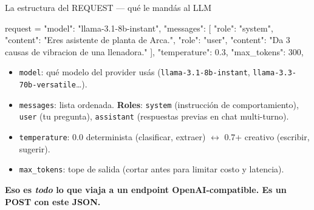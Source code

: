 \documentclass[aspectratio=169, 11pt]{beamer}
\begin{document}
\begin{frame}{La estructura del REQUEST --- qué le mandás al LLM}
  \vspace{2pt}
  \begin{pyblock}
request = {
    "model":       "llama-3.1-8b-instant",
    "messages": [
        {"role": "system", "content": "Eres asistente de planta de Arca."},
        {"role": "user",   "content": "Da 3 causas de vibracion de una llenadora."}
    ],
    "temperature": 0.3,
    "max_tokens":  300,
}
  \end{pyblock}
  \vspace{4pt}
  \begin{itemize}\setlength{\itemsep}{3pt}
    \footnotesize
    \item \texttt{model}: qué modelo del provider usás (\texttt{llama-3.1-8b-instant}, \texttt{llama-3.3-70b-versatile}\dots).
    \item \texttt{messages}: lista ordenada. \textbf{Roles}: \texttt{system} (instrucción de comportamiento),
    \texttt{user} (tu pregunta), \texttt{assistant} (respuestas previas en chat multi-turno).
    \item \texttt{temperature}: 0.0 determinista (clasificar, extraer) $\leftrightarrow$ 0.7+ creativo (escribir, sugerir).
    \item \texttt{max\_tokens}: tope de salida (cortar antes para limitar costo y latencia).
  \end{itemize}
  \vspace{2pt}
  \begin{tcolorbox}[colback=arcaRed!8, colframe=arcaRed, leftrule=3pt,
    boxrule=0pt, sharp corners, left=8pt, right=8pt, top=3pt, bottom=3pt]
    {\footnotesize\color{arcaDark}\bfseries
    Eso es \emph{todo} lo que viaja a un endpoint OpenAI-compatible.
    Es un POST con este JSON.}
  \end{tcolorbox}
\end{frame}
\end{document}
